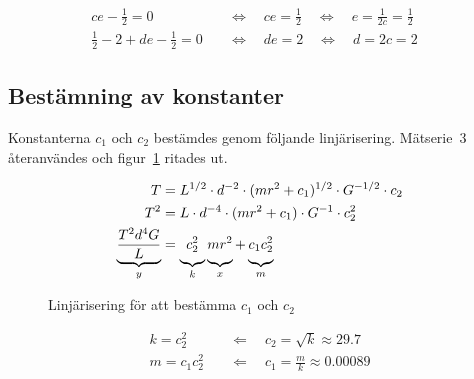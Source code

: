 \documentclass[a4paper,12pt]{article}
\begin{document}
\begin{align}
  ce - \frac{1}{2} = 0 \quad &\Leftrightarrow \quad ce = \frac{1}{2} \quad \Leftrightarrow \quad e = \frac{1}{2c} = \frac{1}{2} & \\[0.5em]
  \frac{1}{2} - 2 + de - \frac{1}{2} = 0 \quad &\Leftrightarrow \quad de = 2 \quad \Leftrightarrow \quad d = 2c = 2 &
\end{align}

\subsection{Bestämning av konstanter}

Konstanterna $c_1$ och $c_2$ bestämdes genom följande linjärisering.
Mätserie~3 återanvändes och figur~\ref{fig:lin_c1_c2} ritades ut.

\begin{align}
  T &= L^{1/2} \cdot d^{-2} \cdot (m r^2 + c_1)^{1/2} \cdot G^{-1/2} \cdot c_2 \nonumber \\
  T^2 &= L \cdot d^{-4} \cdot (m r^2 + c_1) \cdot G^{-1} \cdot c_2^2 \nonumber \\
  \underbrace{\frac{T^2 d^4 G}{L}}_y &= \underbrace{c_2^2 \vphantom{\frac{T^2 d^4 G}{L}}}_k \underbrace{m r^2 \vphantom{\frac{T^2 d^4 G}{L}}}_x + \underbrace{c_1c_2^2 \vphantom{\frac{T^2 d^4 G}{L}}}_m
\end{align}

\begin{figure}[h!]
  \caption{Linjärisering för att bestämma $c_1$ och $c_2$}
  \label{fig:lin_c1_c2}
\end{figure}

\begin{align}
  k = c_2^2 \quad &\Leftarrow \quad c_2 = \sqrt{k} \approx 29.7 \\
  m = c_1c_2^2 \quad &\Leftarrow \quad c_1 = \frac{m}{k} \approx 0.00089
\end{align}
\end{document}
